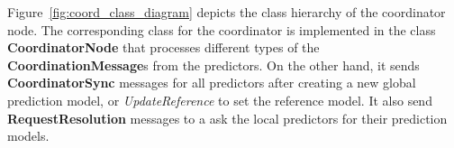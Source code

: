   \par Figure~\ref{fig:coord_class_diagram} depicts the class hierarchy of the coordinator node. The corresponding class for the coordinator is implemented in the class \textbf{CoordinatorNode} that processes different types of the \textbf{CoordinationMessage}s from the predictors.  On the other hand, it sends \textbf{CoordinatorSync} messages for all predictors after creating a new global prediction model, or \textit{UpdateReference} to set the reference model. It also send  \textbf{RequestResolution} messages to a ask the local predictors for their prediction models.
 
 
 